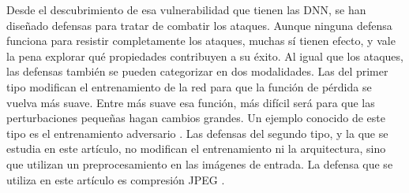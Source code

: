 Desde el descubrimiento de esa vulnerabilidad que tienen las DNN, se han diseñado defensas para tratar de combatir los ataques. Aunque ninguna defensa funciona para resistir completamente los ataques, muchas sí tienen efecto, y vale la pena explorar qué propiedades contribuyen a su éxito. Al igual que los ataques, las defensas también se pueden categorizar en dos modalidades. Las del primer tipo modifican el entrenamiento de la red para que la función de pérdida se vuelva más suave. Entre más suave esa función, más difícil será para que las perturbaciones pequeñas hagan cambios grandes. Un ejemplo conocido de este tipo es el entrenamiento adversario \cite{goodfellow2015explaining, Shaham_2018, szegedy2014intriguing}. Las defensas del segundo tipo, y la que se estudia en este artículo, no modifican el entrenamiento ni la arquitectura, sino que utilizan un preprocesamiento en las imágenes de entrada. La defensa que se utiliza en este artículo es compresión JPEG \cite{das2017keeping}.




